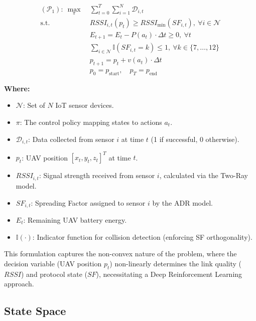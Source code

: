 \documentclass[conference]{IEEEtran}
\begin{document}
\begin{subequations}
\label{eq:P1}
\begin{align}
(\mathcal{P}_1):\ \max_{\pi}\ & \sum_{t=0}^{T} \sum_{i=1}^{N} \mathcal{D}_{i,t} \label{eq:obj} \\
\text{s.t.}\quad & RSSI_{i,t}(p_t) \geq RSSI_{\min}(SF_{i,t}),\ \forall i \in \mathcal{N} \label{eq:c1} \\
                 & E_{t+1} = E_t - P(a_t) \cdot \Delta t \geq 0,\ \forall t \label{eq:c2} \\
                 & \sum_{i \in \mathcal{N}} \mathbb{I}(SF_{i,t} = k) \leq 1,\ \forall k \in \{7,\ldots,12\} \label{eq:c3} \\
                 & p_{t+1} = p_t + v(a_t) \cdot \Delta t \label{eq:c4} \\
                 & p_0 = p_{\text{start}},\quad p_T = p_{\text{end}} \label{eq:c5}
\end{align}
\end{subequations}

\noindent\textbf{Where:}
\begin{itemize}
    \item $\mathcal{N}$: Set of $N$ IoT sensor devices.
    \item $\pi$: The control policy mapping states to actions $a_t$.
    \item $\mathcal{D}_{i,t}$: Data collected from sensor $i$ at time $t$ (1 if successful, 0 otherwise).
    \item $p_t$: UAV position $[x_t, y_t, z_t]^T$ at time $t$.
    \item $RSSI_{i,t}$: Signal strength received from sensor $i$, calculated via the Two-Ray model.
    \item $SF_{i,t}$: Spreading Factor assigned to sensor $i$ by the ADR model.
    \item $E_t$: Remaining UAV battery energy.
    \item $\mathbb{I}(\cdot)$: Indicator function for collision detection (enforcing SF orthogonality).
\end{itemize}

This formulation captures the non-convex nature of the problem, where the decision variable (UAV position $p_t$) non-linearly determines the link quality ($RSSI$) and protocol state ($SF$), necessitating a Deep Reinforcement Learning approach.

\subsection{State Space}
\end{document}
